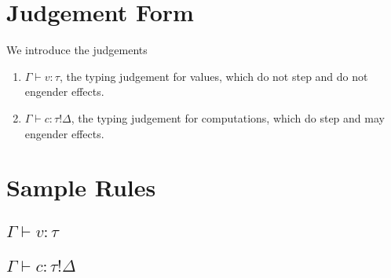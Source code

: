 \documentclass[12pt]{article}
\begin{document}
\newpage
\section{Judgement Form}

We introduce the judgements
\begin{enumerate}
\item $\Gamma \vdash v : \tau$, the typing judgement for values, which do not
step and do not engender effects.
\item $\Gamma \vdash c : \tau!\Delta$, the typing judgement for computations,
which do step and may engender effects.
\end{enumerate}

\newpage
\section{Sample Rules}

\subsection{$\Gamma \vdash v : \tau$}

\begin{mathpar}





\end{mathpar}

\subsection{$\Gamma \vdash c : \tau!\Delta$}
\end{document}
